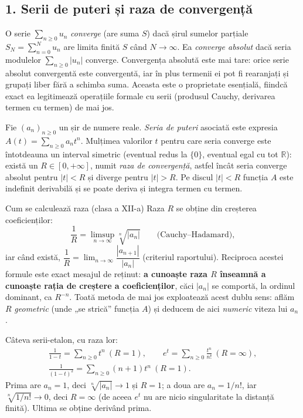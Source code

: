 \subsection*{1. Serii de puteri și raza de convergență}

\begin{definitie}
O serie $\sum_{n\ge0}u_n$ \emph{converge} (are suma $S$) dacă șirul sumelor parțiale $S_N=\sum_{n=0}^{N}u_n$ are limita finită $S$ când $N\to\infty$. Ea \emph{converge absolut} dacă seria modulelor $\sum_{n\ge0}|u_n|$ converge. Convergența absolută este mai tare: orice serie absolut convergentă este convergentă, iar în plus termenii ei pot fi rearanjați și grupați liber fără a schimba suma. Aceasta este o proprietate esențială, fiindcă exact ea legitimează operațiile formale cu serii (produsul Cauchy, derivarea termen cu termen) de mai jos.
\end{definitie}

\begin{definitie}
Fie $(a_n)_{n\ge0}$ un șir de numere reale. \emph{Seria de puteri} asociată este expresia $A(t)=\sum_{n\ge0}a_nt^n$. Mulțimea valorilor $t$ pentru care seria converge este întotdeauna un interval simetric (eventual redus la $\{0\}$, eventual egal cu tot $\mathbb{R}$): există un $R\in[0,+\infty]$, numit \emph{raza de convergență}, astfel încât seria converge absolut pentru $|t|<R$ și diverge pentru $|t|>R$. Pe discul $|t|<R$ funcția $A$ este indefinit derivabilă și se poate deriva și integra termen cu termen.
\end{definitie}

\begin{tehbox}{Cum se calculează raza (clasa a XII-a)}
Raza $R$ se obține din creșterea coeficienților:
\[
\frac1R=\limsup_{n\to\infty}\sqrt[n]{|a_n|}\qquad\text{(Cauchy--Hadamard)},
\]
iar când există, $\dfrac1R=\lim_{n\to\infty}\dfrac{|a_{n+1}|}{|a_n|}$ (criteriul raportului). Reciproca acestei formule este exact mesajul de reținut: \textbf{a cunoaște raza $R$ înseamnă a cunoaște rația de creștere a coeficienților}, căci $|a_n|$ se comportă, la ordinul dominant, ca $R^{-n}$. Toată metoda de mai jos exploatează acest dublu sens: aflăm $R$ \emph{geometric} (unde „se strică'' funcția $A$) și deducem de aici \emph{numeric} viteza lui $a_n$.
\end{tehbox}

\begin{exemplu}
Câteva serii-etalon, cu raza lor:
\[
\begin{gathered}
\frac{1}{1-t}=\sum_{n\ge0}t^n\ (R=1),\qquad
e^t=\sum_{n\ge0}\frac{t^n}{n!}\ (R=\infty),\\
\frac{1}{(1-t)^2}=\sum_{n\ge0}(n+1)t^n\ (R=1).
\end{gathered}
\]
Prima are $a_n=1$, deci $\sqrt[n]{|a_n|}\to1$ și $R=1$; a doua are $a_n=1/n!$, iar $\sqrt[n]{1/n!}\to0$, deci $R=\infty$ (de aceea $e^t$ nu are nicio singularitate la distanță finită). Ultima se obține derivând prima.
\end{exemplu}

